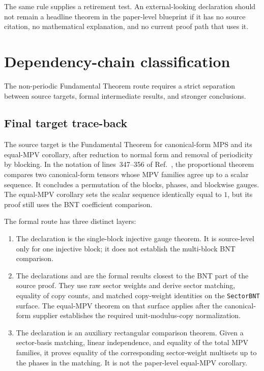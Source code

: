 \documentclass{article}
\begin{document}
The same rule supplies a retirement test. An external-looking declaration
should not remain a headline theorem in the paper-level blueprint if it has no
source citation, no mathematical explanation, and no current proof path that
uses it.

\section{Dependency-chain classification}

The non-periodic Fundamental Theorem route requires a strict separation between
source targets, formal intermediate results, and stronger conclusions.

\subsection{Final target trace-back}

The source target is the Fundamental Theorem for canonical-form MPS and its
equal-MPV corollary, after reduction to normal form and removal of periodicity
by blocking. In the notation of lines~347--356 of
Ref.~\cite{Cirac2016MPDO_arXiv}, the proportional theorem compares two
canonical-form tensors whose MPV families agree up to a scalar sequence. It
concludes a permutation of the blocks, phases, and blockwise gauges. The
equal-MPV corollary sets the scalar sequence identically equal to $1$, but its
proof still uses the BNT coefficient comparison.

The formal route has three distinct layers:
\begin{enumerate}
    \item The declaration
           is the
          single-block injective gauge theorem. It is source-level only for one
          injective block; it does not establish the multi-block BNT
          comparison.
    \item The declarations
           and
           are the formal
          results closest to the BNT part of the source proof. They use raw
          sector weights and derive sector matching, equality of copy counts,
          and matched copy-weight identities on the \texttt{SectorBNT}
          surface. The equal-MPV theorem on that surface applies after the
          canonical-form supplier establishes the required
          unit-modulus-copy normalization.
    \item The declaration
          is an auxiliary rectangular comparison theorem. Given a sector-basis
          matching, linear independence, and equality of the total MPV
          families, it proves equality of the corresponding sector-weight
          multisets up to the phases in the matching. It is not the paper-level
          equal-MPV corollary.
\end{enumerate}
\end{document}
